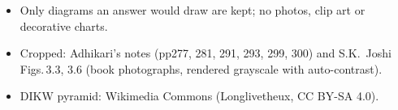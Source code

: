\begin{itemize}
  \item Only diagrams an answer would draw are kept; no photos, clip art or decorative
    charts.
  \item Cropped: Adhikari's notes (pp277, 281, 291, 293, 299, 300) and S.K.\ Joshi
    Figs.\,3.3, 3.6 (book photographs, rendered grayscale with auto-contrast).
  \item DIKW pyramid: Wikimedia Commons (Longlivetheux, CC BY-SA 4.0).
\end{itemize}
